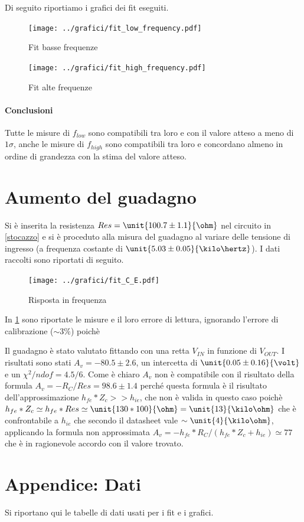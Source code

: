 \documentclass[10pt,a4paper]{article}
\begin{document}
Di seguito riportiamo i grafici dei fit eseguiti.
\begin{figure}[h!]
	\centering
	\begin{minipage}[c]{0.49\textwidth}
		\centering
		\texttt{[image: ../grafici/fit\_low\_frequency.pdf]}
		\caption{Fit basse frequenze}
	\end{minipage}
	\begin{minipage}[c]{0.49\textwidth}
		\centering
		\texttt{[image: ../grafici/fit\_high\_frequency.pdf]}
		\caption{Fit alte frequenze}
	\end{minipage}
\end{figure}

\paragraph{Conclusioni}
Tutte le misure di $f_{low}$ sono compatibili tra loro e con il valore atteso a meno di $1\sigma$, anche le misure di $f_{high}$ sono compatibili tra loro e concordano almeno in ordine di grandezza con la stima del valore atteso.
\section{Aumento del guadagno}

Si è inserita la resistenza $Res = \unit{100.7 \pm 1.1}{\ohm}$ nel circuito in \figurename{\ref{stocazzo}} e si è proceduto alla misura del guadagno al variare delle tensione di ingresso (a frequenza costante di $\unit{5.03 \pm 0.05}{\kilo\hertz}$). I dati raccolti sono riportati di seguito.

\begin{figure}[h!]
	\centering
	\begin{minipage}[c]{0.3\textwidth}
		\centering
		\resizebox{\textwidth}{!}{
			}
		\label{data}
	\end{minipage}
	\begin{minipage}[c]{0.69\textwidth}
		\centering
		\texttt{[image: ../grafici/fit\_C\_E.pdf]}
		\caption{Risposta in frequenza}
	\end{minipage}
\end{figure}

In \tablename{\ref{data}} sono riportate le misure e il loro errore di lettura, ignorando l'errore di calibrazione ($\sim 3\%$) poichè 

Il guadagno è stato valutato fittando con una retta $V_{IN}$ in funzione di $V_{OUT}$. I risultati sono stati $A_v = -80.5 \pm 2.6$, un intercetta di $\unit{0.05 \pm 0.16}{\volt}$ e un $\chi^2/ndof = 4.5/6$.  Come è chiaro $A_v$ non è compatibile con il risultato della formula $A_v = -R_C/Res = 98.6 \pm 1.4$ perché questa formula è il risultato dell'approssimazione $h_{fe}*Z_c >> h_{ie}$, che non è valida in questo caso poichè $h_{fe} * Z_c \simeq h_{fe} * Res \simeq \unit{130 * 100}{\ohm} = \unit{13}{\kilo\ohm} $ che è confrontabile a $h_{ie}$ che secondo il datasheet vale $\sim \unit{4}{\kilo\ohm}$, applicando la formula non approssimata $A_v = -h_{fe}*R_C/(h_{fe}*Z_c + h_{ie}) \simeq 77$ che è in ragionevole accordo con il valore trovato.

\section{Appendice: Dati}
Si riportano qui le tabelle di dati usati per i fit e i grafici.
\end{document}
